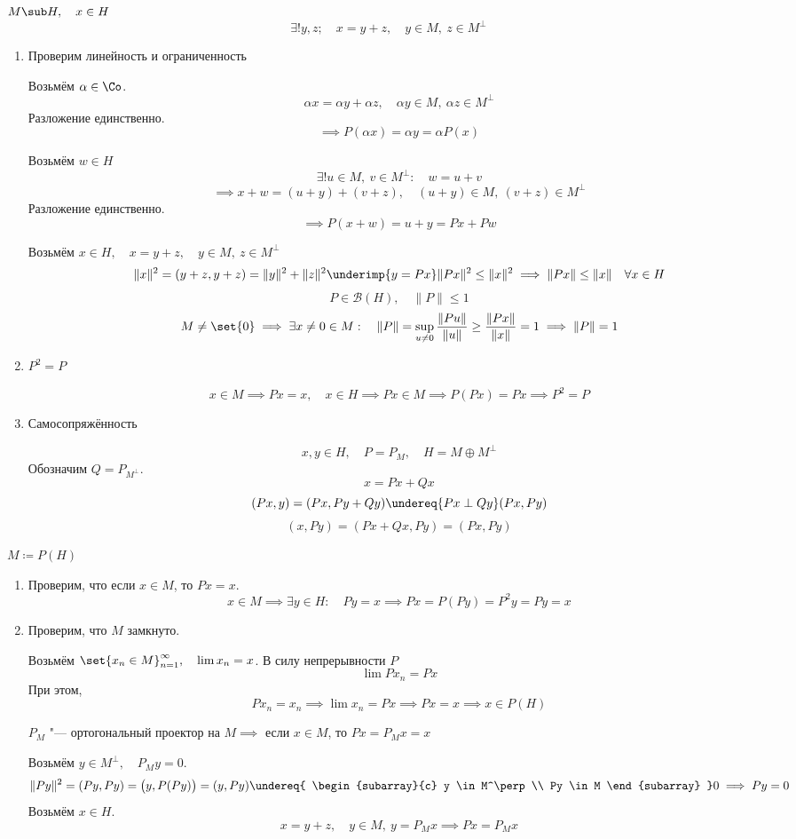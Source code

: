 \begin{eproof}
\item $ M \sub H, \quad x \in H $
	$$ \exists ! y, z ; \quad x = y + z, \quad y \in M, ~ z \in M^\perp $$
	\begin{enumerate}
		\item Проверим линейность и ограниченность

			Возьмём $ \alpha \in \Co $.
			$$ \alpha x = \alpha y + \alpha z, \quad \alpha y \in M, ~ \alpha z \in M^\perp $$
			Разложение единственно.
			$$ \implies P(\alpha x) = \alpha y = \alpha P(x) $$

			Возьмём $ w \in H $
			$$ \exists ! u \in M, ~ v \in M^\perp : \quad w = u + v $$
			$$ \implies x + w = (u + y) + (v + z), \quad (u + y) \in M, ~ (v + z) \in M^\perp $$
			Разложение единственно.
			$$ \implies P(x + w) = u + y = Px + Pw $$

			Возьмём $ x \in H, \quad x = y + z, \quad y \in M, ~ z \in M^\perp $
			$$ \|x\|^2 = (y + z, y + z) = \|y\|^2 + \|z\|^2 \underimp{y = Px}
			\|Px\|^2 \le \|x\|^2 \implies \|Px\| \le \|x\| \quad \forall x \in H $$
			$$ P \in \mathscr B(H), \quad \|P\| \le 1 $$
			$$ M \ne \set{0} \implies \exists x \ne 0 \in M : \quad \|P\| =
			\sup\limits_{u \ne 0} \frac{\|Pu\|}{\|u\|} \ge \frac{\|Px\|}{\|x\|} = 1 \implies
			\|P\| = 1 $$
		\item $ P^2 = P $

			$$ x \in M \implies Px = x, \quad x \in H \implies Px \in M \implies P(Px) = Px \implies
			P^2 = P $$
		\item Самосопряжённость

			$$ x, y \in H, \quad P = P_M, \quad H = M \oplus M^\perp $$
			Обозначим $ Q = P_{M^\perp} $.
			$$ x = Px + Qx $$
			$$ (Px, y) = (Px, Py + Qy) \undereq{Px \perp Qy} (Px, Py) $$
			$$ (x, Py) = (Px + Qx, Py) = (Px, Py) $$
	\end{enumerate}
\item $ M \coloneq P(H) $
	\begin{enumerate}
		\item Проверим, что если $ x \in M $, то $ Px = x $.
			$$ x \in M \implies \exists y \in H : \quad Py = x \implies
			Px = P(Py) = P^2y = Py = x $$
		\item Проверим, что $ M $ замкнуто.

			Возьмём $ \set{x_n \in M}_{n = 1}^\infty, \quad \lim x_n = x $.
			В силу непрерывности $ P $
			$$ \lim Px_n = Px $$
			При этом,
			$$ Px_n = x_n \implies \lim x_n = Px \implies Px = x \implies x \in P(H) $$

			$ P_M $ "--- ортогональный проектор на $ M \implies
			$ если $ x \in M $, то $ Px = P_Mx = x $

			Возьмём $ y \in M^\perp, \quad P_My = 0 $.
			$$ \|Py\|^2 = (Py, Py) = \bigl(y, P(Py)\bigr) = (y, Py) \undereq{
				\begin{subarray}{c}
					y \in M^\perp \\
					Py \in M
				\end{subarray}
			} 0 \implies Py = 0 $$
			Возьмём $ x \in H $.
			$$ x = y + z, \quad y \in M, ~ y = P_Mx \implies Px = P_Mx $$
	\end{enumerate}
\end{eproof}

